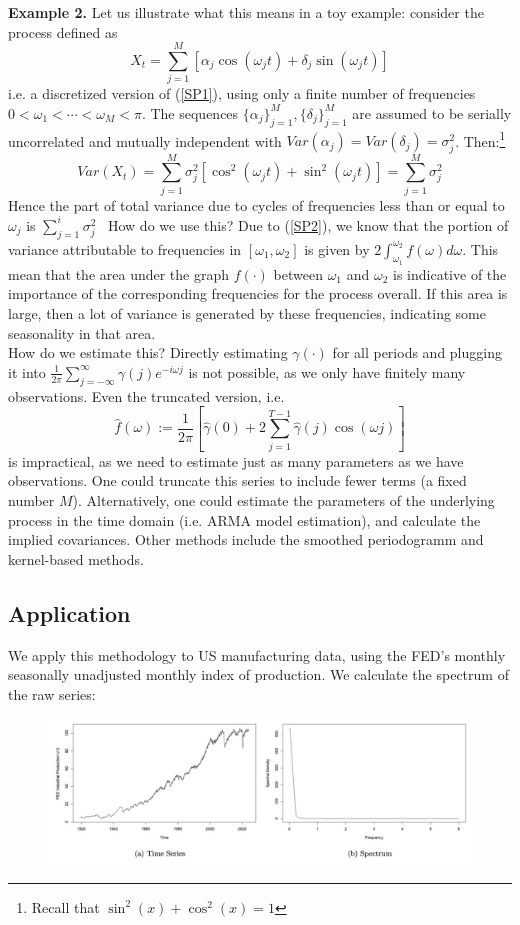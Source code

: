 \bigskip
\textbf{Example 2.} Let us illustrate what this means in a toy example: consider the process defined as \[
X_t=\sum_{j=1}^M [\alpha_j \cos(\omega_j t) + \delta_j \sin(\omega_j t)]
\] i.e. a discretized version of (\ref{SP1}), using only a finite number of frequencies $0<\omega_1<\cdots<\omega_M<\pi$. The sequences $\{\alpha_j\}_{j=1}^M, \{\delta_j\}_{j=1}^M$ are assumed to be serially uncorrelated and mutually independent with $Var(\alpha_j)=Var(\delta_j)=\sigma_j^2$. Then:\footnote{Recall that $\sin^2(x)+\cos^2(x)=1$} \[
Var(X_t)=\sum_{j=1}^M \sigma_j^2 [\cos^2(\omega_j t)+ \sin^2 (\omega_j t)]=\sum_{j=1}^M \sigma_j^2
\] Hence the part of total variance due to cycles of frequencies less than or equal to $\omega_j$ is $\sum_{j=1}^i \sigma_j^2$ \
How do we use this? Due to (\ref{SP2}), we know that the portion of variance attributable to frequencies in $[\omega_1, \omega_2]$ is given by $2\int_{\omega_1}^{\omega_2}f(\omega)d\omega $. This mean that the area under the graph $f(\cdot)$ between $\omega_1$ and $\omega_2$ is indicative of the importance of the corresponding frequencies for the process overall. If this area is large, then a lot of variance is generated by these frequencies, indicating some seasonality in that area.\\

How do we estimate this? Directly estimating $\gamma(\cdot)$ for all periods and plugging it into $\frac{1}{2\pi}\sum_{j=-\infty}^\infty \gamma(j)e^{-i\omega j} $ is not possible, as we only have finitely many observations. Even the truncated version, i.e. \[ 
\hat{f}(\omega):=\frac{1}{2\pi}\left[ \hat{\gamma}(0)+2\sum_{j=1}^{T-1} \hat{\gamma}(j)\cos(\omega j) \right]
\] is impractical, as we need to estimate just as many parameters as we have observations. One could truncate this series to include fewer terms (a fixed number $M$). Alternatively, one could estimate the parameters of the underlying process in the time domain (i.e. ARMA model estimation), and calculate the implied covariances. Other methods include the smoothed periodogramm and kernel-based methods.

\subsection{Application}

We apply this methodology to US manufacturing data, using the FED's monthly seasonally unadjusted monthly index of production. We calculate the spectrum of the raw series: 

\begin{figure}[H]
\includegraphics[scale=0.4]{images/Screenshot 2024-05-06 at 10.37.34.jpg}
\centering
\end{figure}

